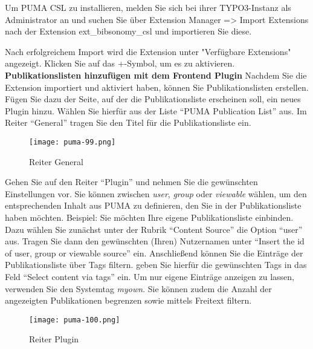 \documentclass[b5paper,11pt,twoside]{scrbook} %
\begin{document}
Um PUMA CSL zu installieren, melden Sie sich bei ihrer TYPO3-Instanz als Administrator an und suchen Sie über Extension Manager => Import Extensions nach der Extension ext\_bibsonomy\_csl und importieren Sie diese.

Nach erfolgreichem Import wird die Extension unter "Verfügbare Extensions" angezeigt. Klicken Sie auf das +-Symbol, um es zu aktivieren.
\newline\newline
\textbf{Publikationslisten hinzufügen mit dem Frontend Plugin}\newline\newline
Nachdem Sie die Extension importiert und aktiviert haben, können Sie Publikationslisten erstellen. Fügen Sie dazu der Seite, auf der die Publikationsliste erscheinen soll, ein neues Plugin hinzu. Wählen Sie hierfür aus der Liste \enquote{PUMA Publication List} aus.\newline%
\newline
Im Reiter \enquote{General} tragen Sie den Titel für die Publikationsliste ein.
\begin{figure}[ht]
 \centering
 \texttt{[image: puma-99.png]}
 \caption{Reiter General}
 \label{figure1}
\end{figure}
\newline \newline
Gehen Sie auf den Reiter \enquote{Plugin} und nehmen Sie die gewünschten Einstellungen vor. Sie können zwischen \textit{user}, \textit{group} oder \textit{viewable} wählen, um den entsprechenden Inhalt aus PUMA zu definieren, den Sie in der Publikationsliste haben möchten.\newline
\newline
Beispiel: Sie möchten Ihre eigene Publikationsliste einbinden. Dazu wählen Sie zunächst unter der Rubrik \enquote{Content Source} die Option \enquote{user} aus. Tragen Sie dann den gewünschten (Ihren) Nutzernamen unter \enquote{Insert the id of user, group or viewable source} ein. Anschließend können Sie die Einträge der Publikationsliste über Tags filtern. geben Sie hierfür die gewünschten Tags in das Feld \enquote{Select content via tags} ein. Um nur eigene Einträge anzeigen zu lassen, verwenden Sie den Systemtag \textit{myown}. Sie können zudem die Anzahl der angezeigten Publikationen begrenzen sowie mittels Freitext filtern.
\begin{figure}[ht]
 \centering
 \texttt{[image: puma-100.png]}
 \caption{Reiter Plugin}
 \label{figure1}
\end{figure}\newline
\end{document}
